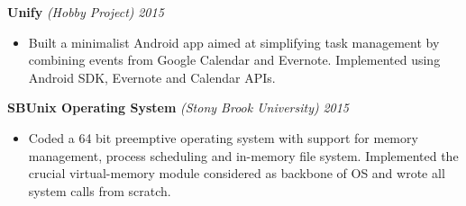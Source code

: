 \documentclass[12pt]{article}
\newcommand{\sectionHeading}[1]{
\vspace{-15pt}
\section*{\small{#1}}
\vspace{-10pt}
\hrule
\vspace{8pt}
}
\newcommand {\projectSectionSubheading}[4]{
    \noindent \small{\textbf{#1} \textit{(#2)} : #3  \hfill \textit{#4}} \\
    \vspace{-10pt}
}
\newcommand {\projectSectionSubheadingAlternate}[3]{
    \noindent \small{\textbf{#1} \textit{(#2)} \hfill \textit{#3}} \\
    \vspace{-22pt}
}
\newcommand {\projectSectionSubheadingAlternateNew}[2]{
    \noindent \small{\textbf{#1} \hfill \textit{#2}} \\
    \vspace{-22pt}
}
\newcommand{\sectionListStart}{
    \begin{itemize}[label={\small{\textbullet}}, leftmargin=20pt] %
}
\newcommand{\sectionListEnd}{\end{itemize} \vspace{-5pt}}
\newcommand{\sectionListItem}[1]{\item \small{#1}}
\begin{document}
    
\projectSectionSubheadingAlternate{Unify}{Hobby Project}{2015}
\sectionListStart
    \sectionListItem
        Built a minimalist Android app aimed at simplifying task management by combining events from Google Calendar and Evernote. Implemented using Android SDK, Evernote and Calendar APIs.
\sectionListEnd

\projectSectionSubheadingAlternate{SBUnix Operating System}{Stony Brook University}{2015}
\sectionListStart
    \sectionListItem
        Coded a 64 bit preemptive operating system with support for memory management, process scheduling and in-memory file system. Implemented the crucial virtual-memory module considered as backbone of OS and wrote all system calls from scratch.
        
\sectionListEnd







\end{document}
